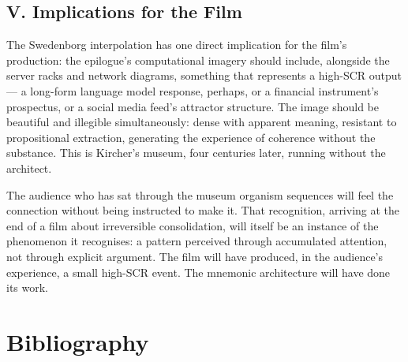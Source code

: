 \documentclass[12pt, a4paper, twoside]{memoir}
\theoremstyle{definition}
\theoremstyle{remark}
\begin{document}
\section*{V. Implications for the Film}

The Swedenborg interpolation has one direct implication for the film's production: the epilogue's computational imagery should include, alongside the server racks and network diagrams, something that represents a high-SCR output --- a long-form language model response, perhaps, or a financial instrument's prospectus, or a social media feed's attractor structure. The image should be beautiful and illegible simultaneously: dense with apparent meaning, resistant to propositional extraction, generating the experience of coherence without the substance. This is Kircher's museum, four centuries later, running without the architect.

The audience who has sat through the museum organism sequences will feel the connection without being instructed to make it. That recognition, arriving at the end of a film about irreversible consolidation, will itself be an instance of the phenomenon it recognises: a pattern perceived through accumulated attention, not through explicit argument. The film will have produced, in the audience's experience, a small high-SCR event. The mnemonic architecture will have done its work.


\backmatter

\chapter*{Bibliography}

\smallskip

\noindent{\color{arkgold}\rule{\linewidth}{0.4pt}}\medskip
\end{document}
